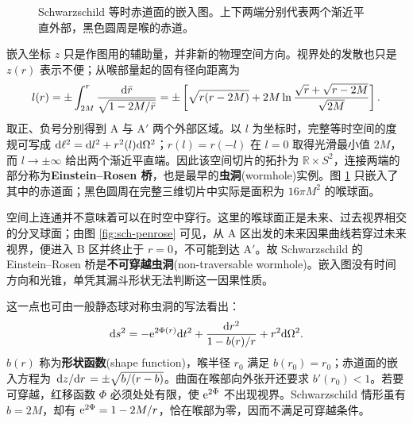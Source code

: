 \begin{figure}[htbp]
    \centering
    \caption{Schwarzschild 等时赤道面的嵌入图。上下两端分别代表两个渐近平直外部，黑色圆周是喉的赤道。}
    \label{fig:flamm-paraboloid}
\end{figure}

嵌入坐标 $z$ 只是作图用的辅助量，并非新的物理空间方向。视界处的发散也只是 $z(r)$ 表示不便；从喉部量起的固有径向距离为
\[
    l(r)=\pm\int_{2M}^{r}\frac{\dd\bar r}{\sqrt{1-2M/\bar r}}
    =\pm\left[\sqrt{r(r-2M)}+2M\ln\frac{\sqrt r+\sqrt{r-2M}}{\sqrt{2M}}\right].
\]
取正、负号分别得到 A 与 A$'$ 两个外部区域。以 $l$ 为坐标时，完整等时空间的度规可写成 $\dd\ell^2=\dd l^2+r^2(l)\dd\Omega^2$；$r(l)=r(-l)$ 在 $l=0$ 取得光滑最小值 $2M$，而 $l\to\pm\infty$ 给出两个渐近平直端。因此该空间切片的拓扑为 $\mathbb R\times S^2$，连接两端的部分称为\textbf{Einstein--Rosen 桥}，也是最早的\textbf{虫洞}(wormhole)实例。图 \ref{fig:flamm-paraboloid} 只嵌入了其中的赤道面；黑色圆周在完整三维切片中实际是面积为 $16\pi M^2$ 的喉球面。

空间上连通并不意味着可以在时空中穿行。这里的喉球面正是未来、过去视界相交的分叉球面；由图 \ref{fig:sch-penrose} 可见，从 A 区出发的未来因果曲线若穿过未来视界，便进入 B 区并终止于 $r=0$，不可能到达 A$'$。故 Schwarzschild 的 Einstein--Rosen 桥是\textbf{不可穿越虫洞}(non-traversable wormhole)。嵌入图没有时间方向和光锥，单凭其漏斗形状无法判断这一因果性质。

这一点也可由一般静态球对称虫洞的写法看出：
\[
    \dd s^2=-\mathrm{e}^{2\Phi(r)}\dd t^2
    +\frac{\dd r^2}{1-b(r)/r}+r^2\dd\Omega^2.
\]
$b(r)$ 称为\textbf{形状函数}(shape function)，喉半径 $r_0$ 满足 $b(r_0)=r_0$；赤道面的嵌入方程为 $\dv*{z}{r}=\pm\sqrt{b/(r-b)}$。曲面在喉部向外张开还要求 $b'(r_0)<1$。若要可穿越，红移函数 $\Phi$ 必须处处有限，使 $\mathrm{e}^{2\Phi}$ 不出现视界。Schwarzschild 情形虽有 $b=2M$，却有 $\mathrm{e}^{2\Phi}=1-2M/r$，恰在喉部为零，因而不满足可穿越条件。

